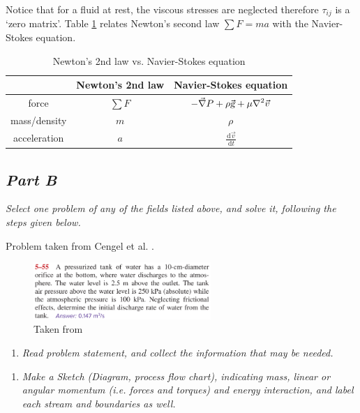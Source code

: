 \documentclass{article}
\newcommand{\ud}{\,\mathrm{d}}
\begin{document}
Notice that for a fluid at rest, the viscous stresses are neglected therefore $\tau_{ij}$ is a   `zero matrix'. Table \ref{tb_NewtonNavierStokes} relates Newton's second law $\displaystyle \sum F = m a$ with the Navier-Stokes equation.

\begin{table}[h!]
\caption{Newton's 2nd law vs. Navier-Stokes equation}
\begin{center}
\begin{tabular}{ c | c   c }
                 & Newton's 2nd law & Navier-Stokes equation \\
    \hline
    force        & $\displaystyle \sum F$ & $\displaystyle - \vec{\nabla} P + \rho \vec{\textsl{g}} + \mu \nabla^2 \vec{v}$ \\
    mass/density & $\displaystyle m$ & $\displaystyle \rho$ \\
    acceleration & $\displaystyle a$ & $\displaystyle \frac{\ud \vec{v}}{\ud t}$
\end{tabular}
\end{center}
\label{tb_NewtonNavierStokes}
\end{table}

\subsection*{\emph{Part B}}
\textit{Select one problem of any of the fields listed above, and solve it, following the steps given below.}

Problem taken from Cengel et al. \cite{Cengel2017}.

\begin{figure}[h!]
\centering
\includegraphics[width=0.60\textwidth]{./img/PROBLEMBernoulliEquation.png}
\caption{Taken from \cite{Cengel2017}}
\label{fig_PROBLEMBernoulliEquation}
\end{figure}

\begin{enumerate}
\item \textit{Read problem statement, and collect the information that may be needed.}
\end{enumerate}



\begin{enumerate}[resume]
\item \textit{Make a Sketch (Diagram, process flow chart), indicating mass, linear or angular momentum (i.e. forces and torques) and energy interaction, and label each stream and boundaries as well.}
\end{enumerate}
\end{document}
